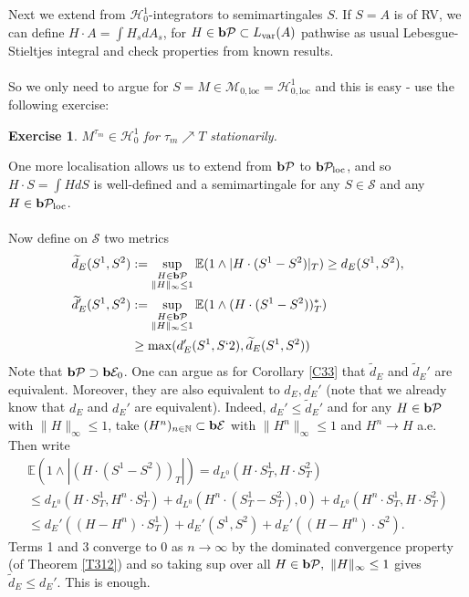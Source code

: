 \documentclass[12pt,a4paper, twoside]{article}
\newtheorem{exe}{Exercise}[section]
\theoremstyle{definition}
\newcommand{\EE}{\mathbb{E}} %
\newcommand{\simple}{\textbf{\text{b}}\mathcal{E}}
\newcommand{\pred}{\textbf{\text{b}}\mathcal{P}}
\begin{document}
Next we extend from $\mathcal{H}_0^1$-integrators to semimartingales $S$. If $S=A$ is of RV, we can define $H \cdot A = \int H_s dA_s$, for $H \in \pred \subset L_{\text{var}}(A)$ pathwise as usual Lebesgue-Stieltjes integral and check properties from known results. \\
\\
So we only need to argue for $S= M \in \mathcal{M}_{0, \text{loc}} = \mathcal{H}_{0, \text{loc}}^1$ and this is easy - use the following exercise: 
\begin{exe} $M^{\tau_m} \in \mathcal{H}_0^1$ for $\tau_m \nearrow T$ stationarily.
\end{exe}
One more localisation allows us to extend from $\pred$ to $\pred_\text{loc}$, and so $H \cdot S = \int H dS$ is well-defined and a semimartingale for any $S \in \mathcal{S}$ and any $H \in \pred_\text{loc}$.\\
\\
Now define on $\mathcal{S}$ two metrics 
\begin{align*}
\widetilde{d}_E(S^1,S^2)&:= \sup_{\substack{H \in \pred \\ \|H\|_\infty \leq 1}} \EE(1 \wedge |H \cdot (S^1-S^2)|_T) \geq d_E(S^1,S^2), \\
\widetilde{d}_E' (S^1,S^2)& := \sup_{ \substack{H \in \pred \\ \|H\|_\infty \leq1 }} \EE(1 \wedge (H \cdot (S^1-S^2))_T^*) \\
& \geq \max( d_E'(S^1,S`2), \widetilde{d}_E(S^1,S^2))
\end{align*}
Note that $\pred \supset \simple_0$. \newpage
One can argue as for Corollary \ref{C33} that $\widetilde{d}_E$ and $\widetilde{d}_E'$ are equivalent. Moreover, they are also equivalent to $d_E, d_E'$ (note that we already know that $d_E$ and $d_E'$ are equivalent). Indeed, $d_E' \leq \widetilde{d}_E'$ and for any $H \in \pred$ with $\|H\|_\infty \leq 1$, take $(H^n)_{n \in \mathbb{N}} \subset \simple$ with $\|H^n\|_\infty \leq 1$ and $H^n \to H$ a.e. Then write
\begin{align*}
\EE(1 \wedge | ( H \cdot (S^1-S^2))_T|) = d_{L^0} (H \cdot S_T^1, H \cdot S_T^2) \\
\leq d_{L^0} ( H \cdot S_T^1, H^n \cdot S_T^1) + d_{L^0} ( H^n \cdot (S_T^1-S_T^2) , 0) + d_{L^0} ( H^n \cdot S_T^1, H \cdot S_T^2) \\
 \leq d_E'((H-H^n) \cdot S_T^1) + d_E'( S^1, S^2) + d_E'( (H- H^n) \cdot S^2).
\end{align*}
Terms 1 and 3 converge to $0$ as $n \to \infty$ by the dominated convergence property (of Theorem \ref{T312}) and so taking sup over all $H \in \pred, \ \|H\|_\infty \leq 1$ gives $\widetilde{d}_E \leq d_E'$. This is enough. 
\end{document}
